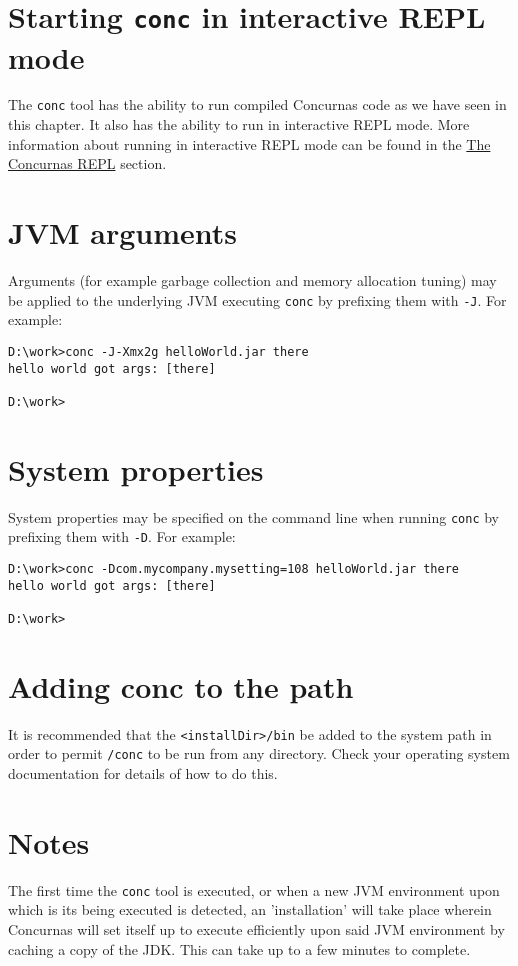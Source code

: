 \documentclass[conc-doc]{subfiles}
\begin{document}
\section{Starting \lstinline[language=None]!conc! in interactive REPL mode}
The \lstinline[language=None]{conc} tool has the ability to run compiled Concurnas code as we have seen in this chapter. It also has the ability to run in interactive REPL mode. More information about running in interactive REPL mode can be found in the \hyperref[ch:repl]{The Concurnas REPL} section.

\section{JVM arguments}
Arguments (for example garbage collection and memory allocation tuning) may be applied to the underlying JVM executing \lstinline[language=None]{conc} by prefixing them with \lstinline[language=None]{-J}. For example:

\begin{lstlisting}[language=None]
D:\work>conc -J-Xmx2g helloWorld.jar there
hello world got args: [there]

D:\work>
\end{lstlisting}

\section{System properties}
System properties may be specified on the command line when running \lstinline[language=None]{conc} by prefixing them with \lstinline[language=None]{-D}. For example:

\begin{lstlisting}[language=None]
D:\work>conc -Dcom.mycompany.mysetting=108 helloWorld.jar there
hello world got args: [there]

D:\work>
\end{lstlisting}

\section{Adding conc to the path}
It is recommended that the \lstinline[language=None]{<installDir>/bin} be added to the system path in order to permit \lstinline[language=None]{/conc} to be run from any directory. Check your operating system documentation for details of how to do this.

\section{Notes}
The first time the \lstinline[language=None]{conc} tool is executed, or when a new JVM environment upon which is its being executed is detected, an 'installation' will take place wherein Concurnas will set itself up to execute efficiently upon said JVM environment by caching a copy of the JDK. This can take up to a few minutes to complete.
\end{document}
